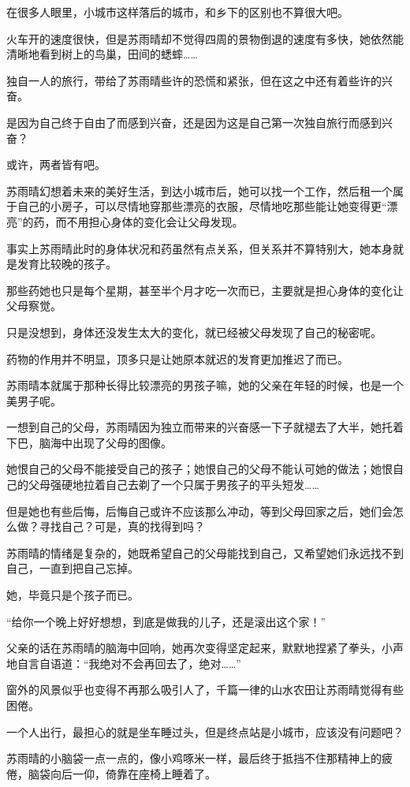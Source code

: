 在很多人眼里，小城市这样落后的城市，和乡下的区别也不算很大吧。

火车开的速度很快，但是苏雨晴却不觉得四周的景物倒退的速度有多快，她依然能清晰地看到树上的鸟巢，田间的蟋蟀……

独自一人的旅行，带给了苏雨晴些许的恐慌和紧张，但在这之中还有着些许的兴奋。

是因为自己终于自由了而感到兴奋，还是因为这是自己第一次独自旅行而感到兴奋？

或许，两者皆有吧。

苏雨晴幻想着未来的美好生活，到达小城市后，她可以找一个工作，然后租一个属于自己的小房子，可以尽情地穿那些漂亮的衣服，尽情地吃那些能让她变得更“漂亮”的药，而不用担心身体的变化会让父母发现。

事实上苏雨晴此时的身体状况和药虽然有点关系，但关系并不算特别大，她本身就是发育比较晚的孩子。

那些药她也只是每个星期，甚至半个月才吃一次而已，主要就是担心身体的变化让父母察觉。

只是没想到，身体还没发生太大的变化，就已经被父母发现了自己的秘密呢。

药物的作用并不明显，顶多只是让她原本就迟的发育更加推迟了而已。

苏雨晴本就属于那种长得比较漂亮的男孩子嘛，她的父亲在年轻的时候，也是一个美男子呢。

一想到自己的父母，苏雨晴因为独立而带来的兴奋感一下子就褪去了大半，她托着下巴，脑海中出现了父母的图像。

她恨自己的父母不能接受自己的孩子；她恨自己的父母不能认可她的做法；她恨自己的父母强硬地拉着自己去剃了一个只属于男孩子的平头短发……

但是她也有些后悔，后悔自己或许不应该那么冲动，等到父母回家之后，她们会怎么做？寻找自己？可是，真的找得到吗？

苏雨晴的情绪是复杂的，她既希望自己的父母能找到自己，又希望她们永远找不到自己，一直到把自己忘掉。

她，毕竟只是个孩子而已。

“给你一个晚上好好想想，到底是做我的儿子，还是滚出这个家！”

父亲的话在苏雨晴的脑海中回响，她再次变得坚定起来，默默地捏紧了拳头，小声地自言自语道：“我绝对不会再回去了，绝对……”

窗外的风景似乎也变得不再那么吸引人了，千篇一律的山水农田让苏雨晴觉得有些困倦。

一个人出行，最担心的就是坐车睡过头，但是终点站是小城市，应该没有问题吧？

苏雨晴的小脑袋一点一点的，像小鸡啄米一样，最后终于抵挡不住那精神上的疲倦，脑袋向后一仰，倚靠在座椅上睡着了。

